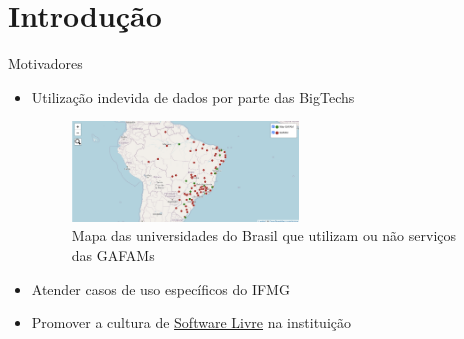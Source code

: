 \AtBeginSection[]{
	\begin{frame}
		\frametitle{}
		\tableofcontents[currentsection]
	\end{frame}
}

\section{Introdução}
\begin{frame}{Motivadores}
	\begin{itemize}[<+->]
		\item Utilização indevida de dados por parte das BigTechs
		\begin{figure}
			\includegraphics[width=6cm]{images/gafam-map.png}
			\caption{Mapa das universidades do Brasil que utilizam ou não serviços das GAFAMs}
		\end{figure}
		\item Atender casos de uso específicos do IFMG
		\item Promover a cultura de \href{https://www.gnu.org/philosophy/free-sw.pt-br.html}{Software Livre} na instituição
	\end{itemize}
\end{frame}